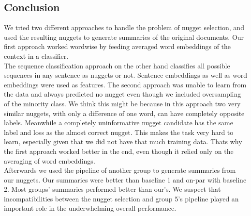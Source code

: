 \subsection{Conclusion}
We tried two different approaches to handle the problem of nugget selection, and used the resulting nuggets to generate summaries of the original documents.
Our first approach worked wordwise by feeding averaged word embeddings of the context in a classifier.\\
The sequence classification approach on the other hand classifies all possible sequences in any sentence as nuggets or not. Sentence embeddings as well as word embeddings were used as features. 
The second approach was unable to learn from the data and always predicted no nugget even though we included oversampling of the minority class. We think this might be because in this approach two very similar nuggets, with only a difference of one word, can have completely opposite labels. Meanwhile a completely uninformative nugget candidate has the same label and loss as the almost correct nugget. This makes the task very hard to learn, especially given that we did not have that much training data. Thats why the first approach worked better in the end, even though it relied only on the averaging of word embeddings.
\\

Afterwards we used the pipeline of another group to generate summaries from our nuggets. Our summaries were better than baseline 1 and on-par with baseline 2. Most groups' summaries performed better than our's. We suspect that incompatibilities between the nugget selection and group 5's pipeline played an important role in the underwhelming overall performance.